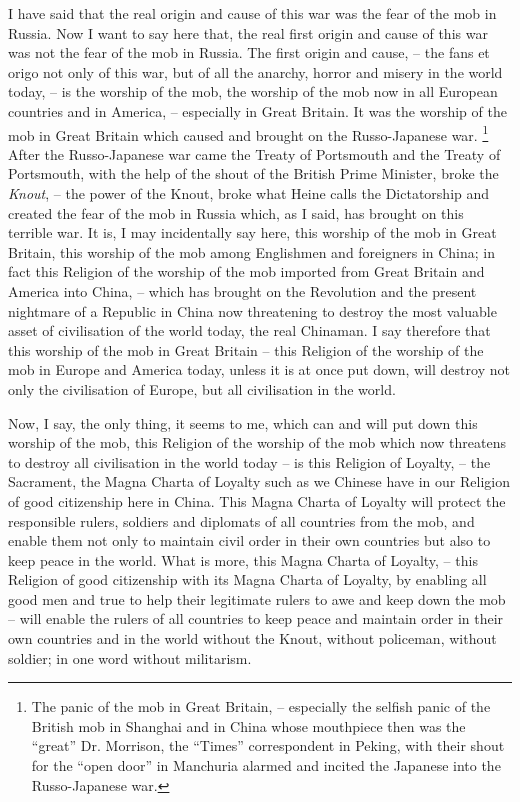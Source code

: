 I have said that the real origin and cause of this war was the fear of the mob in Russia.
Now I want to say here that, the real first origin and cause of this war was not the fear of the mob in Russia.
The first origin and cause,
-- the fans et origo not only of this war, but of all the anarchy, horror and misery in the world today,
-- is the worship of the mob, the worship of the mob now in all European countries and in America,
-- especially in Great Britain. It was the worship of the mob in Great Britain which caused and brought on the Russo-Japanese war.
\footnote{The panic of the mob in Great Britain,  -- especially the selfish panic of the British mob in Shanghai and in China whose mouthpiece then was the ``great'' Dr. Morrison, the ``Times'' correspondent in Peking, with their shout for the ``open door'' in Manchuria alarmed and incited the Japanese into the Russo-Japanese war.}
After the Russo-Japanese war came the Treaty of Portsmouth and the Treaty of Portsmouth, with the help of the shout of the British Prime Minister, broke the \emph{Knout},
-- the power of the Knout, broke what Heine calls the Dictatorship and created the fear of the mob in Russia which, as I said, has brought on this terrible war.
It is, I may incidentally say here, this worship of the mob in Great Britain, this worship of the mob among Englishmen and foreigners in China;
in fact this Religion of the worship of the mob imported from Great Britain and America into China,
-- which has brought on the Revolution and the present nightmare of a Republic in China now threatening to destroy the most valuable asset of civilisation of the world today,
the real Chinaman. I say therefore that this worship of the mob in Great Britain
-- this Religion of the worship of the mob in Europe and America today, unless it is at once put down,
will destroy not only the civilisation of Europe, but all civilisation in the world.


Now, I say, the only thing, it seems to me, which can and will put down this worship of the mob,
this Religion of the worship of the mob which now threatens to destroy all civilisation in the world today -- is this Religion of Loyalty,
-- the Sacrament, the Magna Charta of Loyalty such as we Chinese have in our Religion of good citizenship here in China.
This Magna Charta of Loyalty will protect the responsible rulers, soldiers and diplomats of all countries from the mob,
and enable them not only to maintain civil order in their own countries but also to keep peace in the world.
What is more, this Magna Charta of Loyalty,  -- this Religion of good citizenship with its Magna Charta of Loyalty,
by enabling all good men and true to help their legitimate rulers to awe and keep down the mob
-- will enable the rulers of all countries to keep peace and maintain order in their own countries and in the world without the Knout,
without policeman, without soldier; in one word without militarism.

